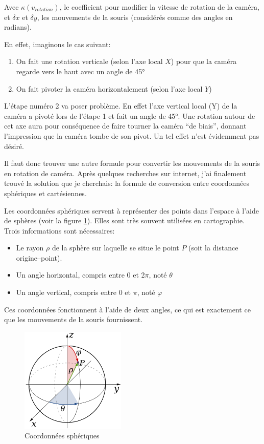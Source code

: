 Avec $\kappa(v_{rotation})$, le coefficient pour modifier la vitesse de rotation de la caméra,\\
et $\delta x$ et $\delta y$, les mouvements de la souris (considérés comme des angles en radians).

En effet, imaginons le cas suivant:
\begin{enumerate}
	\item On fait une rotation verticale (selon l'axe local $X$) pour que la caméra regarde vers le haut avec un angle de 45\si{\degree}
	\item On fait pivoter la caméra horizontalement (selon l'axe local $Y$)
\end{enumerate}

L'étape numéro 2 va poser problème. En effet l'axe vertical local ($\text{Y}$) de la caméra a pivoté lors de l'étape 1 et fait un angle de 45\si{\degree}. Une rotation autour de cet axe aura pour conséquence de faire tourner la caméra \enquote{de biais}, donnant l'impression que la caméra tombe de son pivot. Un tel effet n'est évidemment pas désiré.

Il faut donc trouver une autre formule pour convertir les mouvements de la souris en rotation de caméra. Après quelques recherches sur internet, j'ai finalement trouvé la solution que je cherchais: la formule de conversion entre coordonnées sphériques et cartésiennes\cite{Coordonneesspheriques_}.

Les coordonnées sphériques servent à représenter des points dans l'espace à l'aide de sphères (voir la figure \ref{fig:coordonneesSpheriques}). Elles sont très souvent utilisées en cartographie. Trois informations sont nécessaires:
\begin{itemize}
	\item Le rayon $\rho$ de la sphère sur laquelle se situe le point $P$ (soit la distance origine--point).
	\item Un angle horizontal, compris entre 0 et 2$\pi$, noté $\theta$
	\item Un angle vertical, compris entre 0 et $\pi$, noté $\varphi$
\end{itemize}
Ces coordonnées fonctionnent à l'aide de deux angles, ce qui est exactement ce que les mouvements de la souris fournissent.

\nocite{Adiagramofsphericalcoordinatesdefiningapointbycolatitudelongitudeandradius_Wikipedia}
\begin{figure}[th!]
	\center
	\includegraphics[width=5cm]{images/Technique/coordonneesSpheriques.png}
	\caption{\label{fig:coordonneesSpheriques}Coordonnées sphériques}
\end{figure}


